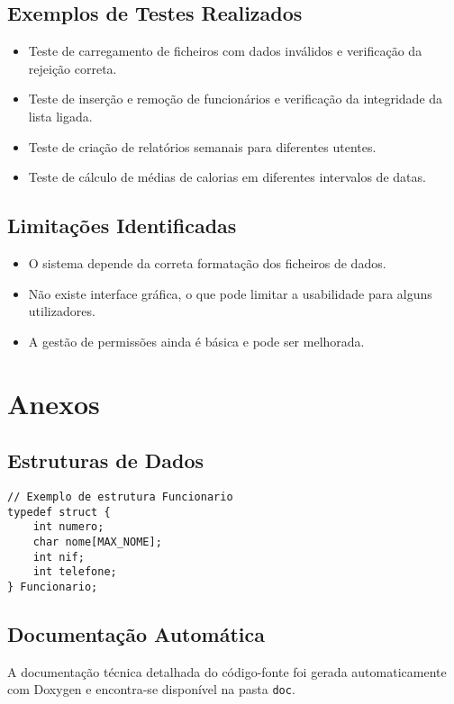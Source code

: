 \documentclass[a4paper,12pt]{report}
\begin{document}
\section{Exemplos de Testes Realizados}
\begin{itemize}
    \item Teste de carregamento de ficheiros com dados inválidos e verificação da rejeição correta.
    \item Teste de inserção e remoção de funcionários e verificação da integridade da lista ligada.
    \item Teste de criação de relatórios semanais para diferentes utentes.
    \item Teste de cálculo de médias de calorias em diferentes intervalos de datas.
\end{itemize}

\section{Limitações Identificadas}
\begin{itemize}
    \item O sistema depende da correta formatação dos ficheiros de dados.
    \item Não existe interface gráfica, o que pode limitar a usabilidade para alguns utilizadores.
    \item A gestão de permissões ainda é básica e pode ser melhorada.
\end{itemize}


\chapter{Anexos}
\section{Estruturas de Dados}
\begin{verbatim}
// Exemplo de estrutura Funcionario
typedef struct {
    int numero;
    char nome[MAX_NOME];
    int nif;
    int telefone;
} Funcionario;
\end{verbatim}

\section{Documentação Automática}
A documentação técnica detalhada do código-fonte foi gerada automaticamente com Doxygen e encontra-se disponível na pasta \texttt{doc}.
\end{document}
